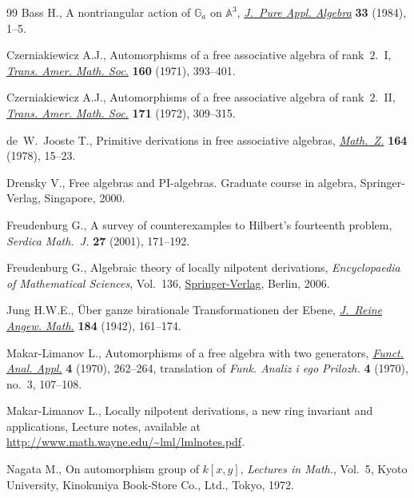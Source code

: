 \documentclass[11pt]{article}
\numberwithin{equation}{section}
\begin{document}
\begin{thebibliography}{99}
Bass H., A nontriangular action of {${\mathbb G}_{a}$} on {${\mathbb A}^{3}$},
 \href{https://doi.org/10.1016/0022-4049(84)90019-7}{\textit{J.~Pure Appl. Algebra}} \textbf{33} (1984), 1--5.

Czerniakiewicz A.J., Automorphisms of a free associative algebra of
 rank~{$2$}.~{I}, \href{https://doi.org/10.2307/1995814}{\textit{Trans. Amer. Math. Soc.}} \textbf{160} (1971),
 393--401.

Czerniakiewicz A.J., Automorphisms of a free associative algebra of
 rank~{$2$}.~{II}, \href{https://doi.org/10.2307/1996385}{\textit{Trans. Amer. Math. Soc.}} \textbf{171} (1972),
 309--315.

de~W.~Jooste T., Primitive derivations in free associative algebras,
 \href{https://doi.org/10.1007/BF01214786}{\textit{Math.~Z.}} \textbf{164} (1978), 15--23.

Drensky V., Free algebras and {PI}-algebras. {G}raduate course in algebra,
 Springer-Verlag, Singapore, 2000.

Freudenburg G., A survey of counterexamples to {H}ilbert's fourteenth problem,
 \textit{Serdica Math.~J.} \textbf{27} (2001), 171--192.

Freudenburg G., Algebraic theory of locally nilpotent derivations,
 \textit{Encyclopaedia of Mathematical Sciences}, Vol.~136, \href{https://doi.org/10.1007/978-3-540-29523-5}{Springer-Verlag},
 Berlin, 2006.

Jung H.W.E., \"{U}ber ganze birationale {T}ransformationen der {E}bene,
 \href{https://doi.org/10.1515/crll.1942.184.161}{\textit{J.~Reine Angew. Math.}} \textbf{184} (1942), 161--174.

Makar-Limanov L., Automorphisms of a free algebra with two generators,
 \href{https://doi.org/10.1007/BF01075252}{\textit{Funct. Anal. Appl.}} \textbf{4} (1970), 262--264,
 translation of \textit{Funk. Analiz i ego Prilozh.} \textbf{4} (1970),  no.~3, 107--108.

Makar-Limanov L., Locally nilpotent derivations, a new ring invariant and applications,
{L}ecture notes, available at \url{http://www.math.wayne.edu/~lml/lmlnotes.pdf}.

Nagata M., On automorphism group of {$k[x,y]$}, \textit{Lectures in Math.},
 Vol.~5, Kyoto University, Kinokuniya Book-Store Co., Ltd., Tokyo, 1972.


\end{thebibliography}
\end{document}
